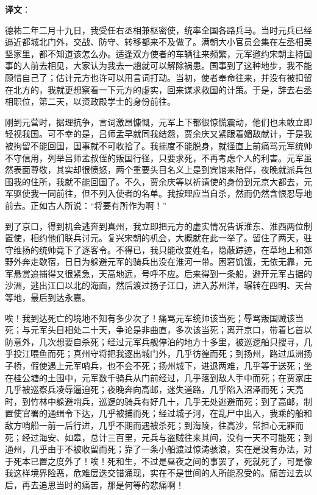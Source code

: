 \documentclass[12pt,UTF-8,openany,a4]{ctexbook}
\begin{document}
\newpage

\begin{Large}
   \noindent \textbf{译文}：
\end{Large}

\vspace{1em}

\begin{large}\yiwen
    
    德祐二年二月十九日，我受任右丞相兼枢密使，统率全国各路兵马。当时元兵已经逼近都城北门外，交战、防守、转移都来不及做了。满朝大小官员会集在左丞相吴坚家里，都不知道该怎么办。适逢双方使者的车辆往来频繁，元军邀约宋朝主持国事的人前去相见，大家认为我去一趟就可以解除祸患。国事到了这种地步，我不能顾惜自己了；估计元方也许可以用言词打动。当初，使者奉命往来，并没有被扣留在北方的，我就更想察看一下元方的虚实，回来谋求救国的计策。于是，辞去右丞相职位，第二天，以资政殿学士的身份前往。
    
    刚到元营时，据理抗争，言词激昂慷慨，元军上下都很惊慌震动，他们也未敢立即轻视我国。可不幸的是，吕师孟早就同我结怨，贾余庆又紧跟着媚敌献计，于是我被拘留不能回国，国事就不可收拾了。我揣度不能脱身，就径直上前痛骂元军统帅不守信用，列举吕师孟叔侄的叛国行径，只要求死，不再考虑个人的利害。元军虽然表面尊敬，其实却很愤怒，两个重要头目名义上是到宾馆来陪伴，夜晚就派兵包围我的住所，我就不能回国了。不久，贾余庆等以祈请使的身份到元京大都去，元军驱使我一同前往，但不列入使者的名单。我按理应当自杀，然而仍然含恨忍辱地前去。正如古人所说：“将要有所作为啊！”
    
    到了京口，得到机会逃奔到真州，我立即把元方的虚实情况告诉淮东、淮西两位制置使，相约他们联兵讨元。复兴宋朝的机会，大概就在此一举了。留住了两天，驻守维扬的统帅竟下了逐客令。不得已，我只能改变姓名，隐蔽踪迹，在草地上和郊野外奔走歇宿，日日为躲避元军的骑兵出没在淮河一带。困窘饥饿，无依无靠，元军悬赏追捕得又很紧急，天高地远，号呼不应。后来得到一条船，避开元军占据的沙洲，逃出江口以北的海面，然后渡过扬子江口，进入苏州洋，辗转在四明、天台等地，最后到达永嘉。
    
    唉！我到达死亡的境地不知有多少次了！痛骂元军统帅该当死；辱骂叛国贼该当死；与元军头目相处二十天，争论是非曲直，多次该当死；离开京口，带着匕首以防意外，几次想要自杀死；经过元军兵舰停泊的地方十多里，被巡逻船只搜寻，几乎投江喂鱼而死；真州守将把我逐出城门外，几乎彷徨而死；到扬州，路过瓜洲扬子桥，假使遇上元军哨兵，也不会不死；扬州城下，进退两难，几乎等于送死；坐在桂公塘的土围中，元军数千骑兵从门前经过，几乎落到敌人手中而死；在贾家庄几乎被巡察兵凌辱逼迫死；夜晚奔向高邮，迷失道路，几乎陷入沼泽而死；天亮时，到竹林中躲避哨兵，巡逻的骑兵有好几十，几乎无处逃避而死；到了高邮，制置使官署的通缉令下达，几乎被捕而死；经过城子河，在乱尸中出入，我乘的船和敌方哨船一前一后行进，几乎不期而遇被杀死；到海陵，往高沙，常担心无罪而死；经过海安、如皋，总计三百里，元兵与盗贼往来其间，没有一天不可能死；到通州，几乎由于不被收留而死；靠了一条小船渡过惊涛骇浪，实在是没有办法，对于死本已置之度外了！唉！死和生，不过是昼夜之间的事罢了，死就死了，可是像我这样境界险恶，危难层迭交错涌现，实在不是世间的人所能忍受的。痛苦过去以后，再去追思当时的痛苦，那是何等的悲痛啊！
    

\end{large}
\end{document}
